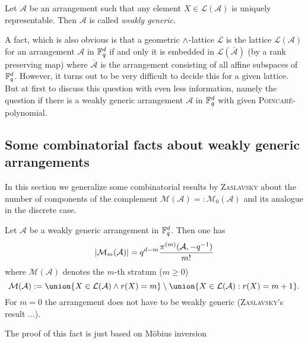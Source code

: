 \documentclass[a4paper]{article}
\begin{document}
\begin{definition}
    Let $\mathcal{A}$ be an arrangement such that any element $X\in\mathcal{L}(\mathcal{A})$ is uniquely representable. Then $\mathcal{A}$ is called \emph{weakly generic}.
\end{definition}

A fact, which is also obvious is that a geometric $\wedge$-lattice $\mathcal{L}$ is the lattice $\mathcal{L}(\mathcal{A})$ for an arrangement $\mathcal{A}$ in $\mathbb{F}_{q}^d$ if and only it is embedded in $\mathcal{L}(\mathcal{\bar{A}})$ (by a rank preserving map) where $\bar{\mathcal{A}}$ is the arrangement consisting of all affine subspaces of $\mathbb{F}_{q}^d$. However, it turns out to be very difficult to decide this for a given lattice.
But at first to discuss this question with even less information, namely the question if there is a weakly generic arrangement $\mathcal{A}$ in $\mathbb{F}_{q}^d$ with given \textsc{Poincaré}-polynomial.

\subsection{Some combinatorial facts about weakly generic arrangements}

In this section we generalize some combinatorial results by \textsc{Zaslavsky} about the number of components of the complement $\mathcal{M}(\mathcal{A})=:\mathcal{M}_0(\mathcal{A})$ and its analogue in the discrete case.

\begin{lemma}
    Let $\mathcal{A}$ be a weakly generic arrangement in $\mathbb{F}_{q}^d$. Then one has
    \begin{equation}
        \left|\mathcal{M}_m(\mathcal{A})\right|= q^{d-m}\frac{\pi^{(m)}(\mathcal{A},-q^{-1})}{m!}
    \end{equation}
    where $\mathcal{M}(\mathcal{A})$ denotes the $m$-th stratum ($m\geq 0$)
    \begin{equation}        \mathcal{M}(\mathcal{A}):=\union\{X\in\mathcal{L}(\mathcal{A})\lgand r(X)=m\}\setminus\union\{X\in\mathcal{L}(\mathcal{A}):r(X)=m+1\}\text{.}
    \end{equation}
    For $m=0$ the arrangement does not have to be weakly generic (\textsc{Zaslavsky}'s result ...).
\end{lemma}

The proof of this fact is just based on Möbius inversion
\end{document}
